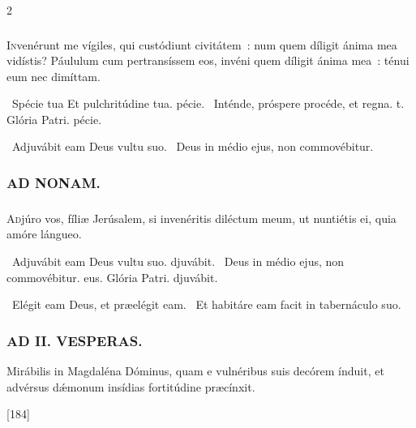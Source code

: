 \documentclass[9pt,twoside]{extarticle}
\begin{document}
\begin{multicols}{2}
{{{\subsubsection*{}
\lettrine{I}nvenérunt me vígiles, qui custódiunt civitátem~: num quem díligit ánima mea vidístis? Páululum cum pertransíssem eos, invéni quem díligit ánima mea~: ténui eum nec dimíttam.

\begin{tightlist}{}
\item {}~Spécie tua \textred{*} Et pulchritúdine tua. pécie. ~Inténde, próspere procéde, et regna. t. Glória Patri. pécie.
\item {}~Adjuvábit eam Deus vultu suo. ~Deus in médio ejus, non commovébitur.
\end{tightlist}

\subsubsection*{\center \textsc{AD NONAM.}}
\subsubsection*{}
\lettrine{A}djúro vos, fíliæ Jerúsalem, si invenéritis diléctum meum, ut nuntiétis ei, quia amóre lángueo.

\begin{tightlist}{}
\item {}~Adjuvábit eam \textred{*} Deus vultu suo. djuvábit. ~Deus in médio ejus, non commovébitur. eus. Glória Patri. djuvábit.
\item {}~Elégit eam Deus, et præelégit eam. ~Et habitáre eam facit in tabernáculo suo.
\end{tightlist}

\subsubsection*{\center \textsc{AD II. VESPERAS.}}
\begin{tightlist}{}
\item {} Mirábilis in Magdaléna Dóminus, quam e vulnéribus suis decórem índuit, et advérsus dǽmonum insídias fortitúdine præcínxit. 
\item {} [184]
\end{tightlist}

}}}
\end{multicols}
\end{document}
